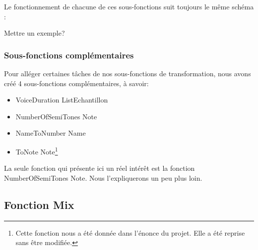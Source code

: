 \documentclass[12pt,a4paper]{article}
\begin{document}
Le fonctionnement  de chacune de ces sous-fonctions suit toujours le même schéma :

Mettre un exemple?

\subsubsection{Sous-fonctions complémentaires}
Pour alléger certaines tâches de nos sous-fonctions de transformation,  nous avons créé 4 sous-fonctions complémentaires, à savoir:
\begin{itemize}
	\item {VoiceDuration ListEchantillon}
	\item {NumberOfSemiTones Note}
	\item {NameToNumber Name}
	\item {ToNote Note}\footnote{Cette fonction nous a été donnée dans l'énonce du projet. Elle a été reprise sans être modifiée.}
\end{itemize}

La seule fonction qui présente ici un réel intérêt est la fonction {NumberOfSemiTones Note}. Nous l'expliquerons un peu plus loin.

\subsection{Fonction Mix}
\end{document}
